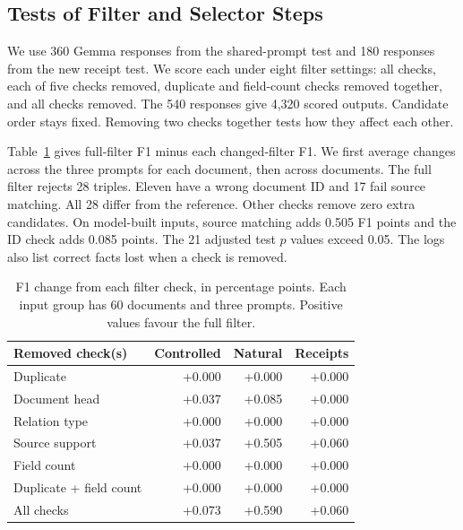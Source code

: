 \subsection{Tests of Filter and Selector Steps}
\label{sec:eval:individual_ablation}

We use 360 Gemma responses from the shared-prompt test and 180 responses
from the new receipt test. We score each under eight filter settings:
all checks, each of five checks removed, duplicate and field-count checks
removed together, and all checks removed. The 540 responses give 4,320
scored outputs. Candidate order stays fixed.
Removing two checks together tests how they affect each other.

Table~\ref{tab:gate_checks} gives full-filter F1 minus each changed-filter
F1. We first average changes across the three prompts for each document,
then across documents. The full filter rejects 28 triples.
Eleven have a wrong document ID and 17 fail source matching.
All 28 differ from the reference. Other checks remove zero extra candidates.
On model-built inputs, source matching adds 0.505 F1 points and the ID check
adds 0.085 points. The 21 adjusted test $p$ values exceed 0.05.
The logs also list correct facts lost when a check is removed.

\begin{table}[t]
\centering
\caption{F1 change from each filter check, in percentage points. Each input group has 60 documents and three prompts. Positive values favour the full filter.}
\label{tab:gate_checks}
\small
\begin{tabular}{lrrr}
\toprule
Removed check(s) & Controlled & Natural & Receipts \\
\midrule
Duplicate & +0.000 & +0.000 & +0.000 \\
Document head & +0.037 & +0.085 & +0.000 \\
Relation type & +0.000 & +0.000 & +0.000 \\
Source support & +0.037 & +0.505 & +0.060 \\
Field count & +0.000 & +0.000 & +0.000 \\
Duplicate + field count & +0.000 & +0.000 & +0.000 \\
All checks & +0.073 & +0.590 & +0.060 \\
\bottomrule
\end{tabular}
\end{table}


